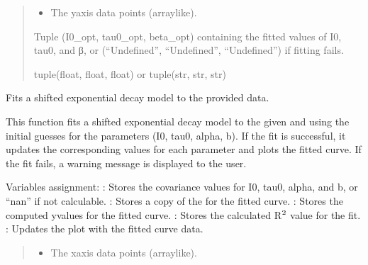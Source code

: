 \documentclass[letterpaper,10pt,english]{sphinxmanual}
\begin{document}
\begin{fulllineitems}
\begin{fulllineitems}
\begin{quote}
\begin{description}
\begin{itemize}
\item {} 
\sphinxAtStartPar
{} \textendash{} The y\sphinxhyphen{}axis data points (array\sphinxhyphen{}like).

\end{itemize}

\sphinxAtStartPar
Tuple (I0\_opt, tau0\_opt, beta\_opt) containing the fitted values of I0, tau0, and β, or (“Undefined”, “Undefined”, “Undefined”) if fitting fails.

\sphinxAtStartPar
tuple(float, float, float) or tuple(str, str, str)

\end{description}\end{quote}

\end{fulllineitems}


\begin{fulllineitems}
\label{\detokenize{FLIMGraphics:FLIMGraphics.FLIMGraphic.fitShiiftedExponential}}
\pysigstartsignatures
{}
\pysigstopsignatures
\sphinxAtStartPar
Fits a shifted exponential decay model to the provided data.

\sphinxAtStartPar
This function fits a shifted exponential decay model to the given  and  using the initial guesses for 
the parameters (I0, tau0, alpha, b). If the fit is successful, it updates the corresponding values for each parameter 
and plots the fitted curve. If the fit fails, a warning message is displayed to the user.

\sphinxAtStartPar
Variables assignment:
\sphinxhyphen{} : Stores the covariance values for I0, tau0, alpha, and b, or “nan” if not calculable.
\sphinxhyphen{} : Stores a copy of the  for the fitted curve.
\sphinxhyphen{} : Stores the computed y\sphinxhyphen{}values for the fitted curve.
\sphinxhyphen{} : Stores the calculated R\(\sp{\text{2}}\) value for the fit.
\sphinxhyphen{} : Updates the plot with the fitted curve data.
\begin{quote}\begin{description}
\begin{itemize}
\item {} 
\sphinxAtStartPar
{} \textendash{} The x\sphinxhyphen{}axis data points (array\sphinxhyphen{}like).


\end{itemize}
\end{description}
\end{quote}
\end{fulllineitems}
\end{fulllineitems}
\end{document}
